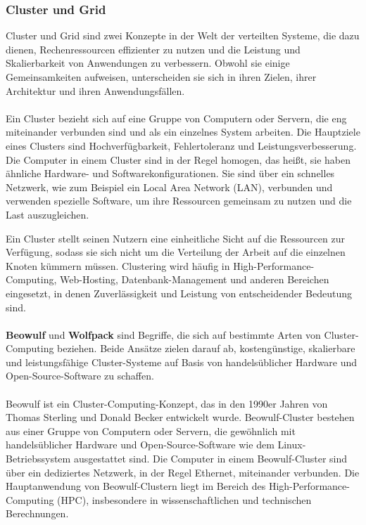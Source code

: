 \subsubsection{Cluster und Grid}

Cluster und Grid sind zwei Konzepte in der Welt der verteilten Systeme, die dazu dienen, Rechenressourcen effizienter zu nutzen und die Leistung und Skalierbarkeit von Anwendungen zu verbessern. Obwohl sie einige Gemeinsamkeiten aufweisen, unterscheiden sie sich in ihren Zielen, ihrer Architektur und ihren Anwendungsfällen.
\\\\
Ein Cluster bezieht sich auf eine Gruppe von Computern oder Servern, die eng miteinander verbunden sind und als ein einzelnes System arbeiten. Die Hauptziele eines Clusters sind Hochverfügbarkeit, Fehlertoleranz und Leistungsverbesserung. Die Computer in einem Cluster sind in der Regel homogen, das heißt, sie haben ähnliche Hardware- und Softwarekonfigurationen. Sie sind über ein schnelles Netzwerk, wie zum Beispiel ein Local Area Network (LAN), verbunden und verwenden spezielle Software, um ihre Ressourcen gemeinsam zu nutzen und die Last auszugleichen.

Ein Cluster stellt seinen Nutzern eine einheitliche Sicht auf die Ressourcen zur Verfügung, sodass sie sich nicht um die Verteilung der Arbeit auf die einzelnen Knoten kümmern müssen. Clustering wird häufig in High-Performance-Computing, Web-Hosting, Datenbank-Management und anderen Bereichen eingesetzt, in denen Zuverlässigkeit und Leistung von entscheidender Bedeutung sind.
\\\\
\textbf{Beowulf} und \textbf{Wolfpack} sind Begriffe, die sich auf bestimmte Arten von Cluster-Computing beziehen. Beide Ansätze zielen darauf ab, kostengünstige, skalierbare und leistungsfähige Cluster-Systeme auf Basis von handelsüblicher Hardware und Open-Source-Software zu schaffen.
\\\\
Beowulf ist ein Cluster-Computing-Konzept, das in den 1990er Jahren von Thomas Sterling und Donald Becker entwickelt wurde. Beowulf-Cluster bestehen aus einer Gruppe von Computern oder Servern, die gewöhnlich mit handelsüblicher Hardware und Open-Source-Software wie dem Linux-Betriebssystem ausgestattet sind. Die Computer in einem Beowulf-Cluster sind über ein dediziertes Netzwerk, in der Regel Ethernet, miteinander verbunden. Die Hauptanwendung von Beowulf-Clustern liegt im Bereich des High-Performance-Computing (HPC), insbesondere in wissenschaftlichen und technischen Berechnungen.

